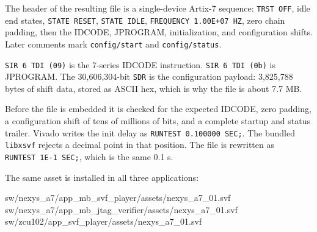 \documentclass[
  11pt,
  a4paper,
]{article}
\newenvironment{Shaded}{}{}
\newcommand{\DataTypeTok}[1]{\textcolor[rgb]{0.56,0.13,0.00}{#1}}
\newcommand{\DecValTok}[1]{\textcolor[rgb]{0.25,0.63,0.44}{#1}}
\newcommand{\KeywordTok}[1]{\textcolor[rgb]{0.00,0.44,0.13}{\textbf{#1}}}
\newcommand{\NormalTok}[1]{#1}
\newcommand{\OperatorTok}[1]{\textcolor[rgb]{0.40,0.40,0.40}{#1}}
\begin{document}
\begin{Shaded}
\end{Shaded}

The header of the resulting file is a single-device Artix-7 sequence:
\texttt{TRST\ OFF}, idle end states, \texttt{STATE\ RESET},
\texttt{STATE\ IDLE}, \texttt{FREQUENCY\ 1.00E+07\ HZ}, zero chain
padding, then the IDCODE, JPROGRAM, initialization, and configuration
shifts. Later comments mark \texttt{config/start} and
\texttt{config/status}.

\texttt{SIR\ 6\ TDI\ (09)} is the 7-series IDCODE instruction.
\texttt{SIR\ 6\ TDI\ (0b)} is JPROGRAM. The 30,606,304-bit \texttt{SDR}
is the configuration payload: 3,825,788 bytes of shift data, stored as
ASCII hex, which is why the file is about 7.7 MB.

Before the file is embedded it is checked for the expected IDCODE, zero
padding, a configuration shift of tens of millions of bits, and a
complete startup and status trailer. Vivado writes the init delay as
\texttt{RUNTEST\ 0.100000\ SEC;}. The bundled \texttt{libxsvf} rejects a
decimal point in that position. The file is rewritten as
\texttt{RUNTEST\ 1E-1\ SEC;}, which is the same 0.1 s.

The same asset is installed in all three applications:

\begin{Shaded}
\begin{Highlighting}[]
\NormalTok{sw/nexys\_a7/app\_mb\_svf\_player/assets/nexys\_a7\_01.svf}
\NormalTok{sw/nexys\_a7/app\_mb\_jtag\_verifier/assets/nexys\_a7\_01.svf}
\NormalTok{sw/zcu102/app\_svf\_player/assets/nexys\_a7\_01.svf}
\end{Highlighting}
\end{Shaded}
\end{document}

